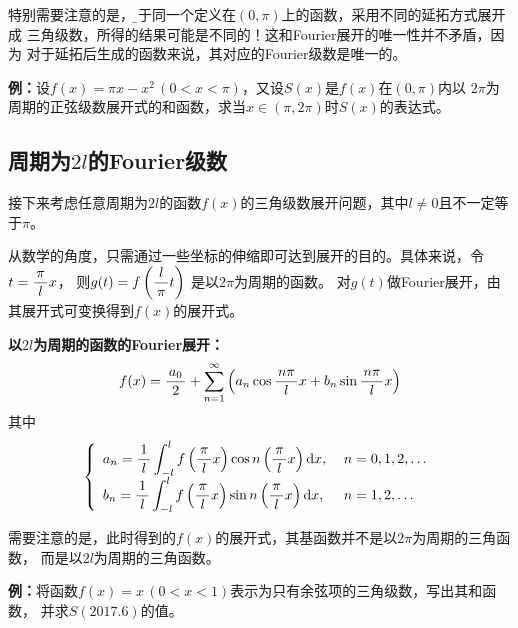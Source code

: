 特别需要注意的是，{\b 对于同一个定义在$(0,\pi)$上的函数，采用不同的延拓方式展开成
三角级数，所得的结果可能是不同的！这和Fourier展开的唯一性并不矛盾，因为
对于延拓后生成的函数来说，其对应的Fourier级数是唯一的。}

{\bf 例：}设$f(x)=\pi x-x^2\,(0<x<\pi)$，又设$S(x)$是$f(x)$在$(0,\pi)$内以
$2\pi$为周期的正弦级数展开式的和函数，求当$x\in(\pi,2\pi)$时$S(x)$的表达式。

\subsection{周期为$2l$的Fourier级数}

接下来考虑任意周期为$2l$的函数$f(x)$的三角级数展开问题，其中$l\ne0$且不一定等于$\pi$。

从数学的角度，只需通过一些坐标的伸缩即可达到展开的目的。具体来说，令$t=\displaystyle\frac{\,{\pi}\,}{\,{l}\,}x$，
则$g(t)=f\left(\displaystyle\frac{\,{l}\,}{\,{\pi}\,}t\right)$ 是以$2\pi$为周期的函数。 
对$g(t)$做Fourier展开，由其展开式可变换得到$f(x)$的展开式。

\begin{thx}
	{\bf 以$2l$为周期的函数的Fourier展开：}
	$$f(x)=\displaystyle\frac{\,{a_0}\,}{\,{2}\,}+\sum\limits_{n=1}^{\infty}\left(a_n\cos\displaystyle\frac{\,{n\pi}\,}{\,{l}\,}x+b_n\sin\displaystyle\frac{\,{n\pi}\,}{\,{l}\,}x\right)$$
	其中
	$$\left\{\begin{array}{ll}
	a_n=\displaystyle\frac{\,{1}\,}{\,{l}\,}\displaystyle\int_{-l}^{l}f\left(\displaystyle\frac{\,{\pi}\,}{\,{l}\,}x\right)
	\cos n\left(\displaystyle\frac{\,{\pi}\,}{\,{l}\,}x\right)\mathrm{d} x,\;&
	n=0,1,2,\ldots\\[5pt] b_n=\displaystyle\frac{\,{1}\,}{\,{l}\,}\displaystyle\int_{-l}^{l}f\left(\displaystyle\frac{\,{\pi}\,}{\,{l}\,}x\right)
	\sin n\left(\displaystyle\frac{\,{\pi}\,}{\,{l}\,}x\right)\mathrm{d} x,\;& n=1,2,\ldots
	\end{array}\right.$$
\end{thx}

需要注意的是，此时得到的$f(x)$的展开式，其基函数并不是以$2\pi$为周期的三角函数，
而是以$2l$为周期的三角函数。

{\bf 例：}将函数$f(x)=x\,(0<x<1)$表示为只有余弦项的三角级数，写出其和函数，
并求$S(2017.6)$的值。

